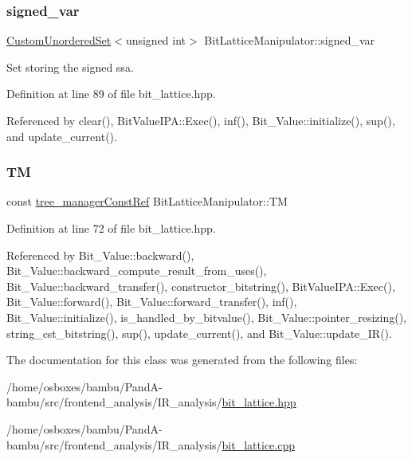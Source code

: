 \subsubsection{\texorpdfstring{signed\+\_\+var}{signed\_var}}
{\footnotesize\ttfamily \hyperlink{classCustomUnorderedSet}{Custom\+Unordered\+Set}$<$unsigned int$>$ Bit\+Lattice\+Manipulator\+::signed\+\_\+var\hspace{0.3cm}{\ttfamily [protected]}}



Set storing the signed ssa. 



Definition at line 89 of file bit\+\_\+lattice.\+hpp.



Referenced by clear(), Bit\+Value\+I\+P\+A\+::\+Exec(), inf(), Bit\+\_\+\+Value\+::initialize(), sup(), and update\+\_\+current().

\mbox{\label{classBitLatticeManipulator_a473b1053ef1f3426a9895c4d604f6aad}} 
\subsubsection{\texorpdfstring{TM}{TM}}
{\footnotesize\ttfamily const \hyperlink{tree__manager_8hpp_a792e3f1f892d7d997a8d8a4a12e39346}{tree\+\_\+manager\+Const\+Ref} Bit\+Lattice\+Manipulator\+::\+TM\hspace{0.3cm}{\ttfamily [protected]}}



Definition at line 72 of file bit\+\_\+lattice.\+hpp.



Referenced by Bit\+\_\+\+Value\+::backward(), Bit\+\_\+\+Value\+::backward\+\_\+compute\+\_\+result\+\_\+from\+\_\+uses(), Bit\+\_\+\+Value\+::backward\+\_\+transfer(), constructor\+\_\+bitstring(), Bit\+Value\+I\+P\+A\+::\+Exec(), Bit\+\_\+\+Value\+::forward(), Bit\+\_\+\+Value\+::forward\+\_\+transfer(), inf(), Bit\+\_\+\+Value\+::initialize(), is\+\_\+handled\+\_\+by\+\_\+bitvalue(), Bit\+\_\+\+Value\+::pointer\+\_\+resizing(), string\+\_\+cst\+\_\+bitstring(), sup(), update\+\_\+current(), and Bit\+\_\+\+Value\+::update\+\_\+\+I\+R().



The documentation for this class was generated from the following files\+:\begin{DoxyCompactItemize}
\item 
/home/osboxes/bambu/\+Pand\+A-\/bambu/src/frontend\+\_\+analysis/\+I\+R\+\_\+analysis/\hyperlink{bit__lattice_8hpp}{bit\+\_\+lattice.\+hpp}\item 
/home/osboxes/bambu/\+Pand\+A-\/bambu/src/frontend\+\_\+analysis/\+I\+R\+\_\+analysis/\hyperlink{bit__lattice_8cpp}{bit\+\_\+lattice.\+cpp}\end{DoxyCompactItemize}
